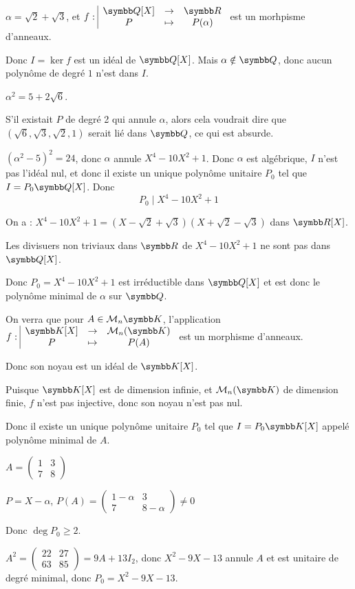 \begin{exemple}
    $\alpha = \sqrt 2 + \sqrt 3$, et $\fonction f {\Q[X]} \R P {P(\alpha)}$ est un morhpisme d'anneaux.

    Donc $I = \ker f$ est un idéal de $\Q[X]$. Mais $\alpha \notin \Q$, donc aucun 
    polynôme de degré $1$ n'est dans $I$.

    $\alpha^2 = 5 + 2 \sqrt 6$. 

    S'il existait $P$ de degré 2 qui annule $\alpha$, alors cela voudrait dire que 
    $(\sqrt 6, \sqrt 3, \sqrt 2, 1)$ serait lié dans $\Q$, ce qui est absurde. 

    $(\alpha^2 - 5)^2 = 24$, donc $\alpha$ annule $X^4 - 10 X^2 + 1$. Donc $\alpha$ est algébrique, 
    $I$ n'est pas l'idéal nul, et donc il existe un unique polynôme unitaire $P_0$ tel que
    $I = P_0 \Q[X]$.
    Donc \[P_0 \mid X^4 - 10 X^2 + 1\]

    On a : $X^4 - 10 X^2 + 1 = (X - \sqrt 2 + \sqrt 3)(X + \sqrt 2 - \sqrt 3)$ dans $\R[X]$.

    Les divisuers non triviaux dans $\R$ de $X^4 - 10 X^2 + 1$ ne sont pas dans $\Q[X]$.

    Donc $P_0 = X^4 - 10 X^2 + 1$ est irréductible dans $\Q[X]$ et est donc le polynôme minimal de
    $\alpha$ sur $\Q$.
\end{exemple}

\begin{exemple}
    On verra que pour $A \in \mathcal M_n{\K}$, l'application $\fonction f {\K[X]}{\mathcal M_n(\K)}{P}{P(A)}$ est un morphisme d'anneaux.

    Donc son noyau est un idéal de $\K[X]$.

    Puisque $\K[X]$ est de dimension infinie, et $\mathcal M_n(\K)$ de dimension finie,
    $f$ n'est pas injective, donc son noyau n'est pas nul.

    Donc il existe un unique polynôme unitaire $P_0$ tel que $I = P_0 \K[X]$ appelé polynôme
    minimal de $A$.

    \avspace $A = \begin{pmatrix}
        1 & 3 \\
        7 & 8
    \end{pmatrix}$

    $P = X - \alpha$, $P(A) = \begin{pmatrix}
        1 - \alpha & 3 \\
        7 & 8 - \alpha
    \end{pmatrix} \neq 0 $

    Donc $\deg P_0 \geqslant 2$.

    $A^2 = \begin{pmatrix}
        22 & 27 \\
        63 & 85
    \end{pmatrix} = 9A + 13 I_2$, donc $X^2 - 9X - 13$ annule $A$ et est unitaire de degré minimal, 
    donc $P_0 = X^2 - 9X - 13$.


\end{exemple}



